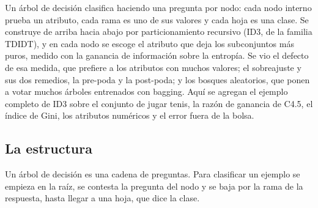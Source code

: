 \documentclass[11pt,letterpaper]{article}
\begin{document}

\newpage




\begin{quick_sum}
    Un árbol de decisión clasifica haciendo una pregunta por nodo: cada
    nodo interno prueba un atributo, cada rama es uno de sus valores y
    cada hoja es una clase. Se construye de arriba hacia abajo por
    particionamiento recursivo (ID3, de la familia TDIDT), y en cada
    nodo se escoge el atributo que deja los subconjuntos más puros,
    medido con la ganancia de información sobre la entropía. Se vio el
    defecto de esa medida, que prefiere a los atributos con muchos
    valores; el sobreajuste y sus dos remedios, la pre-poda y la
    post-poda; y los bosques aleatorios, que ponen a votar muchos
    árboles entrenados con bagging. Aquí se agregan el ejemplo completo
    de ID3 sobre el conjunto de jugar tenis, la razón de ganancia de
    C4.5, el índice de Gini, los atributos numéricos y el error fuera
    de la bolsa.
\end{quick_sum}

\subsection*{La estructura}

Un árbol de decisión es una cadena de preguntas. Para clasificar un
ejemplo se empieza en la raíz, se contesta la pregunta del nodo y se
baja por la rama de la respuesta, hasta llegar a una hoja, que dice la
clase.
\end{document}
